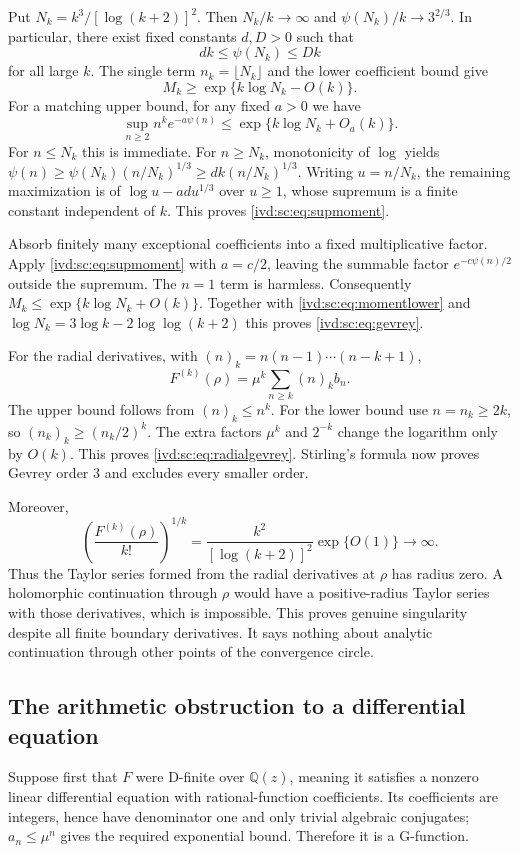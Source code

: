 \documentclass[11pt,letterpaper]{article}
\theoremstyle{remark}\newtheorem{remark}[theorem]{Remark}
\numberwithin{equation}{section}
\begin{document}
Put $N_k=k^3/[\log(k+2)]^2$. Then $N_k/k\to\infty$ and
$\psi(N_k)/k\to3^{2/3}$. In particular, there exist fixed constants $d,D>0$ such that
\[
 dk\le\psi(N_k)\le Dk
\]
for all large $k$. The single term $n_k=\lfloor N_k\rfloor$ and the
lower coefficient bound give
\begin{equation}\label{ivd:sc:eq:momentlower}
 M_k\ge\exp\{k\log N_k-O(k)\}.
\end{equation}
For a matching upper bound, for any fixed $a>0$ we have
\begin{equation}\label{ivd:sc:eq:supmoment}
 \sup_{n\ge2}n^k e^{-a\psi(n)}
 \le\exp\{k\log N_k+O_a(k)\}.
\end{equation}
For $n\le N_k$ this is immediate. For $n\ge N_k$, monotonicity of
$\log$ yields
$\psi(n)\ge\psi(N_k)(n/N_k)^{1/3}\ge dk(n/N_k)^{1/3}$.
Writing $u=n/N_k$, the remaining maximization is of
$\log u-ad u^{1/3}$ over $u\ge1$, whose supremum is a finite
constant independent of $k$. This proves \eqref{ivd:sc:eq:supmoment}.

Absorb finitely many exceptional coefficients into a fixed multiplicative
factor. Apply \eqref{ivd:sc:eq:supmoment} with $a=c/2$, leaving the summable
factor $e^{-c\psi(n)/2}$ outside the supremum. The $n=1$ term is
harmless. Consequently $M_k\le\exp\{k\log N_k+O(k)\}$.
Together with \eqref{ivd:sc:eq:momentlower} and
$\log N_k=3\log k-2\log\log(k+2)$ this proves \eqref{ivd:sc:eq:gevrey}.

For the radial derivatives, with $(n)_k=n(n-1)\cdots(n-k+1)$,
\[
 F^{(k)}(\rho)=\mu^k\sum_{n\ge k}(n)_k b_n.
\]
The upper bound follows from $(n)_k\le n^k$. For the lower bound use
$n=n_k\ge2k$, so $(n_k)_k\ge(n_k/2)^k$. The extra factors
$\mu^k$ and $2^{-k}$ change the logarithm only by $O(k)$.
This proves \eqref{ivd:sc:eq:radialgevrey}. Stirling's formula now proves
Gevrey order $3$ and excludes every smaller order.

Moreover,
\[
 \left(\frac{F^{(k)}(\rho)}{k!}\right)^{1/k}
 =\frac{k^2}{[\log(k+2)]^2}\exp\{O(1)\}\longrightarrow\infty.
\]
Thus the Taylor series formed from the radial derivatives at $\rho$
has radius zero. A holomorphic continuation through $\rho$ would have
a positive-radius Taylor series with those derivatives, which is
impossible. This proves genuine singularity despite all finite
boundary derivatives. It says nothing about analytic continuation
through other points of the convergence circle.

\subsection{The arithmetic obstruction to a differential equation}
Suppose first that $F$ were D-finite over $\mathbb Q(z)$, meaning it
satisfies a nonzero linear differential equation with rational-function
coefficients. Its coefficients are integers, hence have denominator one
and only trivial algebraic conjugates; $a_n\le\mu^n$ gives the required
exponential bound. Therefore it is a G-function.
\end{document}

